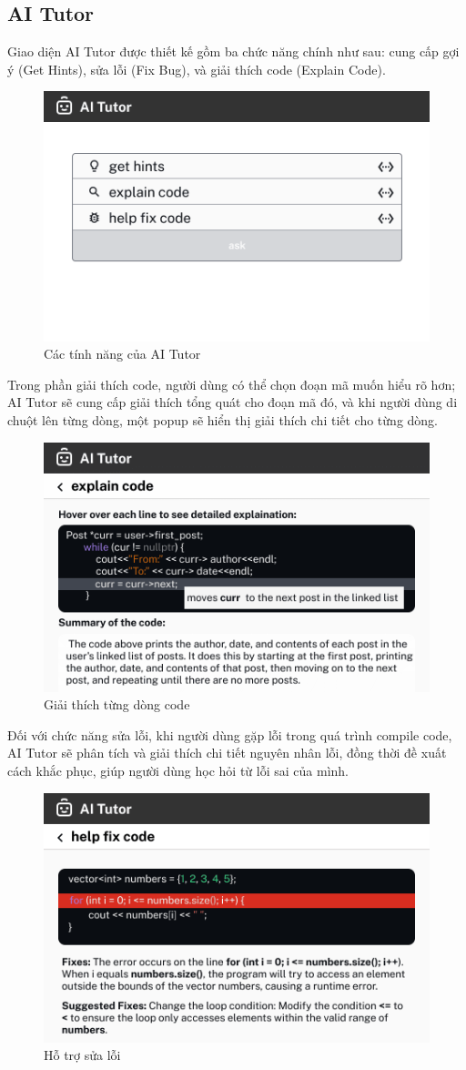 \subsection{AI Tutor}
Giao diện AI Tutor được thiết kế gồm ba chức năng chính như sau: cung cấp gợi ý (Get Hints), sửa lỗi (Fix Bug), và giải thích code (Explain Code). 
\begin{figure}[H]
    \centering
    \includegraphics[width=0.7\linewidth]{Images/Anh/UI_AI_tutor.png}
    \caption{Các tính năng của AI Tutor}
    \label{fig:enter-label}
\end{figure}
Trong phần giải thích code, người dùng có thể chọn đoạn mã muốn hiểu rõ hơn; AI Tutor sẽ cung cấp giải thích tổng quát cho đoạn mã đó, và khi người dùng di chuột lên từng dòng, một popup sẽ hiển thị giải thích chi tiết cho từng dòng.
\begin{figure}[H]
    \centering
    \includegraphics[width=0.7\linewidth]{Images/Anh/UI_AI_explain_code.png}
    \caption{Giải thích từng dòng code}
    \label{fig:enter-label}
\end{figure}
Đối với chức năng sửa lỗi, khi người dùng gặp lỗi trong quá trình compile code, AI Tutor sẽ phân tích và giải thích chi tiết nguyên nhân lỗi, đồng thời đề xuất cách khắc phục, giúp người dùng học hỏi từ lỗi sai của mình.
\begin{figure}[H]
    \centering
    \includegraphics[width=0.7\linewidth]{Images/Anh/UI_help_fix_code.png}
    \caption{Hỗ trợ sửa lỗi}
    \label{fig:enter-label}
\end{figure}
